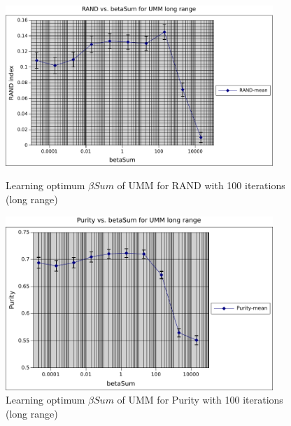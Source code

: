 \begin{figure}
    \centering
    \begin{minipage}{0.45\textwidth}
        \centering
        \includegraphics[width=0.9\textwidth]{fig/betaSum_rand_umm1.pdf}
        \caption{Learning optimum $\beta Sum$ of UMM for RAND with 100 iterations (long range)}
    \end{minipage}\hfill
    \begin{minipage}{0.45\textwidth}
        \centering
        \includegraphics[width=0.9\textwidth]{fig/betaSum_purity_umm1.pdf}
        \caption{Learning optimum $\beta Sum$ of UMM for Purity with 100 iterations (long range)}
    \end{minipage}
\end{figure}
